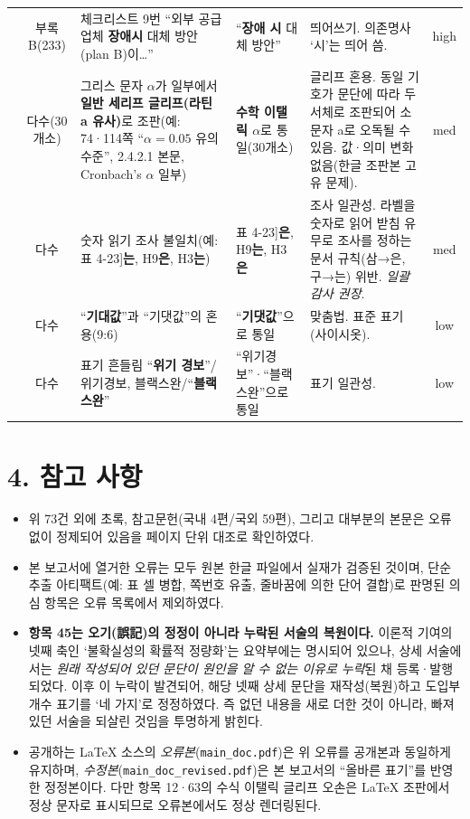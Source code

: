 \documentclass[11pt,a4paper]{article}
\newcommand{\err}[1]{{\color{errred}\textbf{#1}}}
\begin{document}
\begin{longtable}{@{}c c >{\RaggedRight}p{4.6cm} >{\RaggedRight}p{3.0cm} >{\RaggedRight}p{3.4cm} c@{}}
\addlinespace
69 & 부록 B(233) & 체크리스트 9번 ``외부 공급업체 \err{장애시} 대체 방안(plan B)이…'' & ``\err{장애 시} 대체 방안'' & 띄어쓰기. 의존명사 `시'는 띄어 씀. & high \\
\addlinespace
70 & 다수(30개소) & 그리스 문자 $\alpha$가 일부에서 \err{일반 세리프 글리프(라틴 a 유사)}로 조판(예: 74·114쪽 ``$\alpha=0.05$ 유의수준'', 2.4.2.1 본문, Cronbach's $\alpha$ 일부) & \err{수학 이탤릭 $\alpha$}로 통일(30개소) & 글리프 혼용. 동일 기호가 문단에 따라 두 서체로 조판되어 소문자 a로 오독될 수 있음. 값·의미 변화 없음(한글 조판본 고유 문제). & med \\
\addlinespace
71 & 다수 & 숫자 읽기 조사 불일치(예: 표 4-23]\err{는}, H9\err{은}, H3\err{는}) & 표 4-23]\err{은}, H9\err{는}, H3\err{은} & 조사 일관성. 라벨을 숫자로 읽어 받침 유무로 조사를 정하는 문서 규칙(삼→은, 구→는) 위반. \emph{일괄 감사 권장}. & med \\
\addlinespace
72 & 다수 & ``\err{기대값}''과 ``기댓값''의 혼용(9:6) & ``\err{기댓값}''으로 통일 & 맞춤법. 표준 표기(사이시옷). & low \\
\addlinespace
73 & 다수 & 표기 흔들림 ``\err{위기 경보}''/위기경보, 블랙스완/``\err{블랙 스완}'' & ``위기경보''·``블랙 스완''으로 통일 & 표기 일관성. & low \\
\bottomrule
\end{longtable}

\section*{4. 참고 사항}

\begin{itemize}
\item 위 73건 외에 초록, 참고문헌(국내 4편/국외 59편), 그리고 대부분의 본문은
      오류 없이 정제되어 있음을 페이지 단위 대조로 확인하였다.
\item 본 보고서에 열거한 오류는 모두 원본 한글 파일에서 실재가 검증된 것이며,
      단순 추출 아티팩트(예: 표 셀 병합, 쪽번호 유출, 줄바꿈에 의한 단어 결합)로 판명된
      의심 항목은 오류 목록에서 제외하였다.
\item \textbf{항목 45는 오기(誤記)의 정정이 아니라 누락된 서술의 복원이다.} 이론적 기여의
      넷째 축인 `불확실성의 확률적 정량화'는 요약부에는 명시되어 있으나, 상세 서술에서는
      \emph{원래 작성되어 있던 문단이 원인을 알 수 없는 이유로 누락}된 채 등록·발행되었다.
      이후 이 누락이 발견되어, 해당 넷째 상세 문단을 재작성(복원)하고 도입부 개수 표기를
      `네 가지'로 정정하였다. 즉 없던 내용을 새로 더한 것이 아니라, 빠져 있던 서술을
      되살린 것임을 투명하게 밝힌다.
\item 공개하는 \LaTeX{} 소스의 \emph{오류본}(\texttt{main\_doc.pdf})은 위 오류를 공개본과
      동일하게 유지하며, \emph{수정본}(\texttt{main\_doc\_revised.pdf})은 본 보고서의
      ``올바른 표기''를 반영한 정정본이다. 다만 항목 12·63의 수식 이탤릭 글리프 오손은
      \LaTeX{} 조판에서 정상 문자로 표시되므로 오류본에서도 정상 렌더링된다.
\end{itemize}
\end{document}
